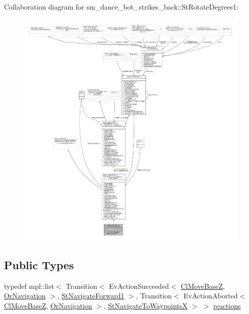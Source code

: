 Collaboration diagram for sm\+\_\+dance\+\_\+bot\+\_\+strikes\+\_\+back\+:\+:St\+Rotate\+Degrees1\+:
\nopagebreak
\begin{figure}[H]
\begin{center}
\leavevmode
\includegraphics[width=350pt]{structsm__dance__bot__strikes__back_1_1StRotateDegrees1__coll__graph}
\end{center}
\end{figure}
\subsection*{Public Types}
\begin{DoxyCompactItemize}
\item 
typedef mpl\+::list$<$ Transition$<$ Ev\+Action\+Succeeded$<$ \hyperlink{classmove__base__z__client_1_1ClMoveBaseZ}{Cl\+Move\+BaseZ}, \hyperlink{classsm__dance__bot__strikes__back_1_1OrNavigation}{Or\+Navigation} $>$, \hyperlink{structsm__dance__bot__strikes__back_1_1StNavigateForward1}{St\+Navigate\+Forward1} $>$, Transition$<$ Ev\+Action\+Aborted$<$ \hyperlink{classmove__base__z__client_1_1ClMoveBaseZ}{Cl\+Move\+BaseZ}, \hyperlink{classsm__dance__bot__strikes__back_1_1OrNavigation}{Or\+Navigation} $>$, \hyperlink{structsm__dance__bot__strikes__back_1_1StNavigateToWaypointsX}{St\+Navigate\+To\+WaypointsX} $>$ $>$ \hyperlink{structsm__dance__bot__strikes__back_1_1StRotateDegrees1_ac753fd21a410d0201e6577ada7edcaa4}{reactions}
\end{DoxyCompactItemize}
